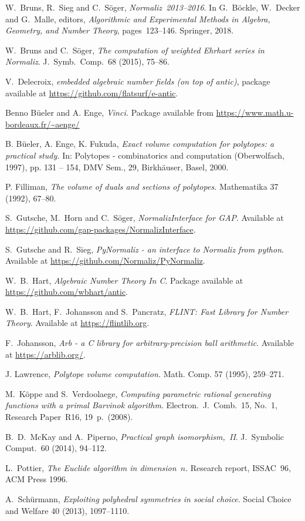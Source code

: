 \documentclass[12pt,a4paper]{scrartcl}
\theoremstyle{definition}
\begin{document}
\begin{thebibliography}{15.}
W.~Bruns, R.~Sieg and C.~S\"oger,
\emph{Normaliz~2013--2016}.
In
G.~B\"ockle, W.~Decker and G.~Malle, editors,
\emph{Algorithmic and Experimental Methods in Algebra, Geometry, and Number Theory},
pages~123--146.
Springer, 2018.

W.~Bruns and C.~S\"oger,
\emph{The computation of weighted Ehrhart series in Normaliz}.
J.\ Symb.\ Comp.\ 68 (2015), 75--86.

V.~Delecroix,
\emph{embedded algebraic number fields (on top of antic)},
package available at \url{https://github.com/flatsurf/e-antic}.

 Benno B\"{u}eler and A. Enge, \emph{Vinci.} Package available from \url{https://www.math.u-bordeaux.fr/~aenge/}

B. Büeler, A. Enge, K. Fukuda, \emph{Exact volume computation for polytopes: a practical study.} In: Polytopes - combinatorics and computation (Oberwolfach, 1997), pp. 131 -- 154,
DMV Sem., 29, Birkhäuser, Basel, 2000.

P. Filliman, \emph{The volume of duals and sections of polytopes. } Mathematika 37 (1992), 67--80.

S.~Gutsche, M.~Horn and C.~S\"oger,
\emph{NormalizInterface for GAP}.
Available at \url{https://github.com/gap-packages/NormalizInterface}.

S.~Gutsche and R.~Sieg,
\emph{PyNormaliz - an interface to Normaliz from python}.
Available at \url{https://github.com/Normaliz/PyNormaliz}.

W.~B.~Hart,
\emph{Algebraic Number Theory In C}.
Package available at \url{https://github.com/wbhart/antic}.

W.~B.~Hart, F.~Johansson and S.~Pancratz,
\emph{FLINT: Fast Library for Number Theory}.
Available at \url{https://flintlib.org}.

F.~Johansson,
\emph{Arb - a C library for arbitrary-precision ball arithmetic}.
Available at \url{https://arblib.org/}.

 J. Lawrence, \emph{Polytope volume computation.} Math. Comp. 57 (1995), 259--271.

M.~K\"oppe and S.~Verdoolaege,
\emph{Computing parametric rational generating functions with a primal Barvinok algorithm}.
Electron.\ J.\ Comb.\ 15, No.\ 1, Research Paper~R16, 19~p.\ (2008).

B.~D.~McKay and A.~Piperno,
\emph{Practical graph isomorphism,~II}.
J.\ Symbolic Comput.\ 60 (2014), 94--112.

L.~Pottier,
\emph{The Euclide algorithm in dimension~$n$}.
Research report, ISSAC~96, ACM Press 1996.

A.~Sch\"urmann,
\emph{Exploiting polyhedral symmetries in social choice}.
Social Choice and Welfare 40 (2013), 1097--1110.
\end{thebibliography}
\end{document}
